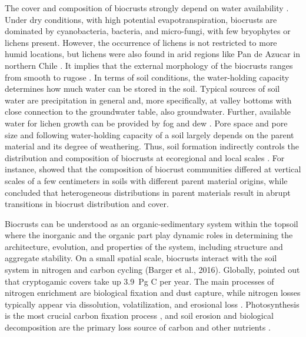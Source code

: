 The cover and composition of biocrusts strongly depend on water availability \citep{Bowker2016}. Under dry conditions, with high potential evapotranspiration, biocrusts are dominated by cyanobacteria, bacteria, and micro-fungi, with few bryophytes or lichens present. However, the occurrence of lichens is not restricted to more humid locations, but lichens were also found in arid regions like Pan de Azucar in northern Chile \citep{Jung2020a,Jung2020b}. It implies that the external morphology of the biocrusts ranges from smooth to rugose \citep{Chamizo2016}. In terms of soil conditions, the water-holding capacity determines how much water can be stored in the soil. Typical sources of soil water are precipitation in general and, more specifically, at valley bottoms with close connection to the groundwater table, also groundwater. Further, available water for lichen growth can be provided by fog and dew \citep{Jung2019}. Pore space and pore size and following water-holding capacity of a soil largely depends on the parent material and its degree of weathering. Thus, soil formation indirectly controls the distribution and composition of biocrusts at ecoregional and local scales \citep{Bowker2016}. For instance, \citet{Steven2013} showed that the composition of biocrust communities differed at vertical scales of a few centimeters in soils with different parent material origins, while \citet{Bowker2016} concluded that heterogeneous distributions in parent materials result in abrupt transitions in biocrust distribution and cover.

Biocrusts can be understood as an organic-sedimentary system within the topsoil where the inorganic and the organic part play dynamic roles in determining the architecture, evolution, and properties of the system, including structure and aggregate stability. On a small spatial scale, biocrusts interact with the soil system in nitrogen and carbon cycling (Barger et al., 2016). Globally, \citet{Elbert2012} pointed out that cryptogamic covers take up \SI{3.9}{\peta\gram} C per year. The main processes of nitrogen enrichment are biological fixation and dust capture, while nitrogen losses typically appear via dissolution, volatilization, and erosional loss \citep{Barger2016}. Photosynthesis is the most crucial carbon fixation process \citep{Elbert2012,Porada2014}, and soil erosion and biological decomposition are the primary loss source of carbon and other nutrients \citep{Li2008}.

